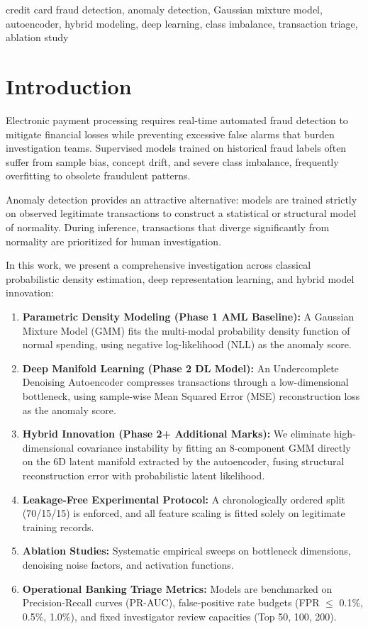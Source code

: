 \documentclass[conference]{IEEEtran}
\begin{document}
\begin{IEEEkeywords}
credit card fraud detection, anomaly detection, Gaussian mixture model, autoencoder, hybrid modeling, deep learning, class imbalance, transaction triage, ablation study
\end{IEEEkeywords}

\section{Introduction}
Electronic payment processing requires real-time automated fraud detection to mitigate financial losses while preventing excessive false alarms that burden investigation teams. Supervised models trained on historical fraud labels often suffer from sample bias, concept drift, and severe class imbalance, frequently overfitting to obsolete fraudulent patterns.

Anomaly detection provides an attractive alternative: models are trained strictly on observed legitimate transactions to construct a statistical or structural model of normality. During inference, transactions that diverge significantly from normality are prioritized for human investigation.

In this work, we present a comprehensive investigation across classical probabilistic density estimation, deep representation learning, and hybrid model innovation:
\begin{enumerate}
    \item \textbf{Parametric Density Modeling (Phase 1 AML Baseline):} A Gaussian Mixture Model (GMM) fits the multi-modal probability density function of normal spending, using negative log-likelihood (NLL) as the anomaly score.
    \item \textbf{Deep Manifold Learning (Phase 2 DL Model):} An Undercomplete Denoising Autoencoder compresses transactions through a low-dimensional bottleneck, using sample-wise Mean Squared Error (MSE) reconstruction loss as the anomaly score.
    \item \textbf{Hybrid Innovation (Phase 2+ Additional Marks):} We eliminate high-dimensional covariance instability by fitting an 8-component GMM directly on the 6D latent manifold extracted by the autoencoder, fusing structural reconstruction error with probabilistic latent likelihood.
    \item \textbf{Leakage-Free Experimental Protocol:} A chronologically ordered split (70/15/15) is enforced, and all feature scaling is fitted solely on legitimate training records.
    \item \textbf{Ablation Studies:} Systematic empirical sweeps on bottleneck dimensions, denoising noise factors, and activation functions.
    \item \textbf{Operational Banking Triage Metrics:} Models are benchmarked on Precision-Recall curves (PR-AUC), false-positive rate budgets (FPR $\le$ 0.1\%, 0.5\%, 1.0\%), and fixed investigator review capacities (Top 50, 100, 200).
\end{enumerate}
\end{document}
